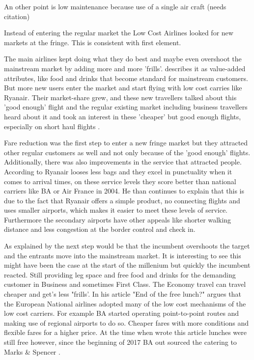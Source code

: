 \documentclass[a4paper, 11pt]{article}
\begin{document}
An other point is low maintenance because use of a single air craft (needs citation)

Instead of entering the regular market the Low Cost Airlines looked for new markets at the fringe. This is consistent with
\cite{Christensen2015} first element.


The main airlines kept doing what they do best and maybe even overshoot the mainstream market by adding more and more 'frills'. \cite{Droege} describes it as value-added attributes, like food and drinks that become standard for mainstream customers. But more new users enter the market and start flying with low cost carries like Ryanair. Their market-share grew, and these new travellers talked about this 'good enough' flight and the regular existing market including business travellers heard about it and took an interest in these 'cheaper' but good enough flights, especially on short haul flights \citep{TiddBessant}.

Fare reduction was the first step to enter a new fringe market but they attracted other regular customers as well and not only because of the 'good enough' flights. Additionally, there was also improvements in the service that attracted people. According to \cite{Barrett} Ryanair looses less bags and they excel in punctuality when it comes to arrival times, on these service levels they score better than national carriers like BA or Air France in 2004. He \citep{Barrett} than continues to explain that this is due to the fact that Ryanair offers a simple product, no connecting flights and uses smaller airports, which makes it easier to meet these levels of service. Furthermore the secondary airports have other appeals like shorter walking distance and less congestion at the border control and check in.

As explained by \cite{Christensen2015} the next step would be that the incumbent overshoots the target and the entrants move into
the mainstream market. It is interesting to see this might have been the case at the start of the millenium but quickly the
incumbent reacted. Still providing leg space and free food and drinks for the demanding customer in Business and sometimes
First Class. The Economy travel can travel cheaper and get's less "frills'. In his article "End of the free lunch?"
\cite{Dennis} argues that the European National airlines adopted many of the low cost mechanisms of the low cost carriers. For
example BA started operating point-to-point routes and making use of regional airports to do so. Cheaper fares with more
conditions and flexible fares for a higher price. At the time when \cite{Dennis} wrote this article lunches were still free
however, since the beginning of 2017 BA out sourced the catering to Marks \& Spencer \citep{Calder}.
\end{document}
